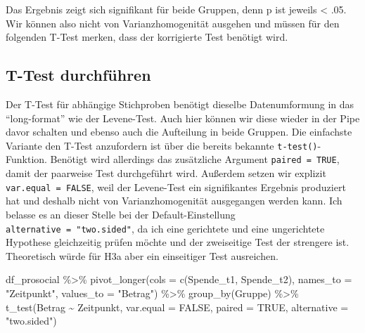 \documentclass[
]{book}
\newenvironment{Shaded}{\begin{snugshade}}{\end{snugshade}}
\newcommand{\AttributeTok}[1]{\textcolor[rgb]{0.77,0.63,0.00}{#1}}
\newcommand{\ConstantTok}[1]{\textcolor[rgb]{0.00,0.00,0.00}{#1}}
\newcommand{\FunctionTok}[1]{\textcolor[rgb]{0.00,0.00,0.00}{#1}}
\newcommand{\NormalTok}[1]{#1}
\newcommand{\SpecialCharTok}[1]{\textcolor[rgb]{0.00,0.00,0.00}{#1}}
\newcommand{\StringTok}[1]{\textcolor[rgb]{0.31,0.60,0.02}{#1}}
\begin{document}
Das Ergebnis zeigt sich signifikant für beide Gruppen, denn p ist jeweils \textless{} .05. Wir können also nicht von Varianzhomogenität ausgehen und müssen für den folgenden T-Test merken, dass der korrigierte Test benötigt wird.

\hypertarget{t-test-durchfuxfchren-2}{%
\subsection{T-Test durchführen}\label{t-test-durchfuxfchren-2}}

Der T-Test für abhängige Stichproben benötigt dieselbe Datenumformung in das ``long-format'' wie der Levene-Test. Auch hier können wir diese wieder in der Pipe davor schalten und ebenso auch die Aufteilung in beide Gruppen. Die einfachste Variante den T-Test anzufordern ist über die bereits bekannte \texttt{t-test()}- Funktion. Benötigt wird allerdings das zusätzliche Argument \texttt{paired\ =\ TRUE}, damit der paarweise Test durchgeführt wird. Außerdem setzen wir explizit \texttt{var.equal\ =\ FALSE}, weil der Levene-Test ein signifikantes Ergebnis produziert hat und deshalb nicht von Varianzhomogenität ausgegangen werden kann. Ich belasse es an dieser Stelle bei der Default-Einstellung \texttt{alternative\ =\ "two.sided"}, da ich eine gerichtete und eine ungerichtete Hypothese gleichzeitig prüfen möchte und der zweiseitige Test der strengere ist. Theoretisch würde für H3a aber ein einseitiger Test ausreichen.

\begin{Shaded}
\begin{Highlighting}[]
\NormalTok{df\_prosocial }\SpecialCharTok{\%\textgreater{}\%}
        \FunctionTok{pivot\_longer}\NormalTok{(}\AttributeTok{cols =} \FunctionTok{c}\NormalTok{(Spende\_t1, Spende\_t2), }
                     \AttributeTok{names\_to =} \StringTok{"Zeitpunkt"}\NormalTok{, }
                     \AttributeTok{values\_to =} \StringTok{"Betrag"}\NormalTok{) }\SpecialCharTok{\%\textgreater{}\%} 
        \FunctionTok{group\_by}\NormalTok{(Gruppe) }\SpecialCharTok{\%\textgreater{}\%} 
        \FunctionTok{t\_test}\NormalTok{(Betrag }\SpecialCharTok{\textasciitilde{}}\NormalTok{ Zeitpunkt, }
               \AttributeTok{var.equal =} \ConstantTok{FALSE}\NormalTok{, }
               \AttributeTok{paired =} \ConstantTok{TRUE}\NormalTok{,}
               \AttributeTok{alternative =} \StringTok{"two.sided"}\NormalTok{)}
\end{Highlighting}
\end{Shaded}
\end{document}
